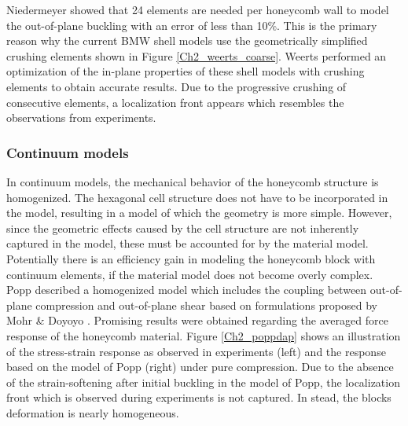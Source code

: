 Niedermeyer \cite{niedermeyer} showed that 24 elements are needed per honeycomb wall to model the out-of-plane buckling with an error of less than 10\%. This is the primary reason why the current BMW shell models use the geometrically simplified crushing elements shown in Figure \ref{Ch2_weerts_coarse}. Weerts \cite{weerts} performed an optimization of the in-plane properties of these shell models with crushing elements to obtain accurate results. Due to the progressive crushing of consecutive elements, a localization front appears which resembles the observations from experiments.{\color{red}{NADEEL VAN SHELL MODELS NOEMEN -> dap noemt mesh dependency}}\\

\subsubsection{Continuum models}
In continuum models, the mechanical behavior of the honeycomb structure is homogenized. The hexagonal cell structure does not have to be incorporated in the model, resulting in a model of which the geometry is more simple. However, since the geometric effects caused by the cell structure are not inherently captured in the model, these must be accounted for by the material model. Potentially there is an efficiency gain in modeling the honeycomb block with continuum elements, if the material model does not become overly complex.\\
Popp \cite{popp} described a homogenized model which includes the coupling between out-of-plane compression and out-of-plane shear based on formulations proposed by Mohr \& Doyoyo \cite{mohrdoyoyo2004a}. Promising results were obtained regarding the averaged force response of the honeycomb material. Figure \ref{Ch2_poppdap} shows an illustration of the stress-strain response as observed in experiments (left) and the response based on the model of Popp (right) under pure compression.  Due to the absence of the strain-softening after initial buckling in the model of Popp, the localization front which is observed during experiments is not captured. In stead, the blocks deformation is nearly homogeneous.
